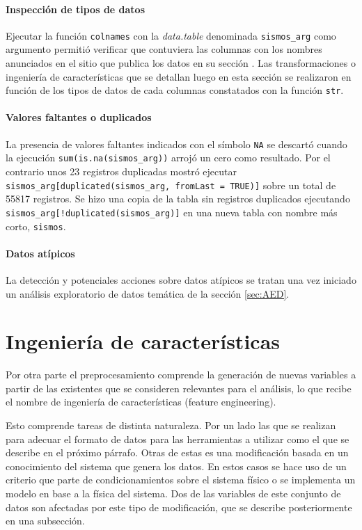 \documentclass[a4paper]{report}
\begin{document}
\paragraph{Inspección de tipos de datos}
Ejecutar la función \verb'colnames' con la \emph{data.table} denominada \verb'sismos_arg' como argumento permitió verificar que contuviera las columnas con los nombres anunciados en el sitio que publica los datos en su sección \cite[Exploración inicial]{daniela_parada_ic-datasets-docencia_nodate}.
Las transformaciones o ingeniería de características que se detallan luego en esta sección se realizaron en función de los tipos de datos de cada columnas constatados con la función \verb'str'.


\paragraph{Valores faltantes o duplicados}
La presencia de valores faltantes indicados con el símbolo \verb'NA' se descartó cuando la ejecución \verb'sum(is.na(sismos_arg))' arrojó un cero como resultado.
Por el contrario unos \num{23} registros duplicadas mostró
ejecutar \verb'sismos_arg[duplicated(sismos_arg, fromLast = TRUE)]' sobre un total de \num{55817} registros.
Se hizo una copia de la tabla sin registros duplicados ejecutando \verb'sismos_arg[!duplicated(sismos_arg)]' en una nueva tabla con nombre más corto, \verb'sismos'.


\paragraph{Datos atípicos}
La detección y potenciales acciones sobre datos atípicos se tratan una vez iniciado un análisis exploratorio de datos temática de la sección \ref{sec:AED}.



\section{Ingeniería de características}

Por otra parte el preprocesamiento comprende la generación de nuevas variables a partir de las existentes que se consideren relevantes para el análisis, lo que recibe el nombre de ingeniería de características (feature engineering).

Esto comprende tareas de distinta naturaleza.
Por un lado las que se realizan para adecuar el formato de datos para las herramientas a utilizar como el que se describe en el próximo párrafo.
Otras de estas es una modificación basada en un conocimiento del sistema que genera los datos.
En estos casos se hace uso de un criterio que parte de condicionamientos sobre el sistema físico o se implementa un modelo en base a la física del sistema.
Dos de las variables de este conjunto de datos son afectadas por este tipo de modificación, que se describe posteriormente en una subsección.
\end{document}
